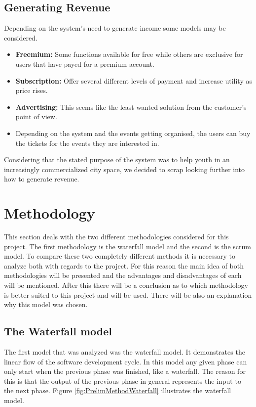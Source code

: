 \subsection{Generating Revenue}
\label{subsec:PrelimMarketRevenue}
Depending on the system’s need to generate income some models may be considered. 
\begin{itemize}
  \item \textbf{Freemium:} Some functions available for free while others are exclusive for users that have payed for a premium account.
  \item \textbf{Subscription:} Offer several different levels of payment and increase utility as price rises.
  \item \textbf{Advertising:} This seems like the least wanted solution from the customer’s point of view.
  \item Depending on the system and the events getting organised, the users can buy the tickets for the events they are interested in.
\end{itemize}

Considering that the stated purpose of the system was to help youth in an increasingly commercialized city space, we decided to scrap looking further into how to generate revenue.

\section{Methodology}
\label{sec:PrelimMethod}

This section deals with the two different methodologies considered for this project. The first methodology is the waterfall model and the second is the scrum model. To compare these two completely different methods it is necessary to analyze both with regards to the project. For this reason the main idea of both methodologies will be presented and the advantages and disadvantages of each will be mentioned. After this there will be a conclusion as to which methodology is better suited to this project and will be used. There will be also an explanation why this model was chosen.

\subsection{The Waterfall model}
\label{sec:PrelimMethodWaterfall}
The first model that was analyzed was the waterfall model. It demonstrates the linear flow of the software development cycle. In this model any given phase can only start when the previous phase was finished, like a waterfall. The reason for this is that the output of the previous phase in general represents the input to the next phase. Figure \ref{fig:PrelimMethodWaterfall} illustrates the waterfall model.

